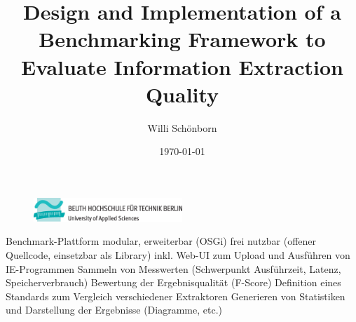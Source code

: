\documentclass[a4paper,12pt]{article}
\title{Design and Implementation of a Benchmarking Framework to Evaluate Information Extraction Quality}
\author{Willi Schönborn}
\date{\today}
\begin{document}
\begin{figure}[H]
\centering
\includegraphics[width=0.5\textwidth]{beuth.eps}
\maketitle
\end{figure}

Benchmark-Plattform
modular, erweiterbar (OSGi)
frei nutzbar (offener Quellcode, einsetzbar als Library)
inkl. Web-UI zum Upload und Ausführen von IE-Programmen
Sammeln von Messwerten (Schwerpunkt Ausführzeit, Latenz, Speicherverbrauch)
Bewertung der Ergebnisqualität (F-Score)
Definition eines Standards zum Vergleich verschiedener Extraktoren
Generieren von Statistiken und Darstellung der Ergebnisse (Diagramme, etc.)

\newpage
\nocite{*}
\printbibliography
\end{document}
